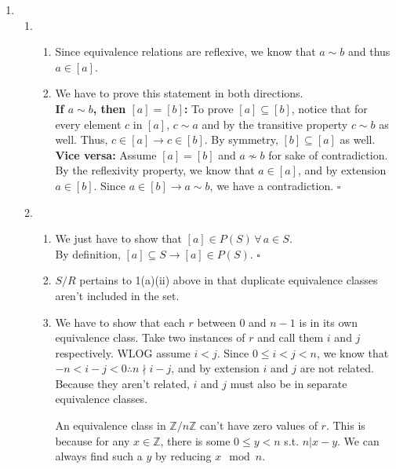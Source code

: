 \documentclass[12pt]{article}
\begin{document}
    \begin{enumerate}
        \item \begin{enumerate}
                  \item \begin{enumerate}
                            \item Since equivalence relations are reflexive, we know that $a \sim b$ and thus $a \in [a]$.
                            \item We have to prove this statement in both directions. \\
                            \textbf{If $a \sim b$, then $[a]=[b]$:}
                            To prove $[a] \subseteq [b]$, notice that for every element $c$ in $[a]$, $c \sim a$ and by the transitive property $c \sim b$ as well. Thus, $c \in [a] \rightarrow c \in [b]$.
                            By symmetry, $[b] \subseteq [a]$ as well. \\
                            \textbf{Vice versa:} Assume $[a] = [b]$ and $a \nsim b$ for sake of contradiction.
                            By the reflexivity property, we know that $a \in [a]$, and by extension $a \in [b]$.
                            Since $a \in [b] \rightarrow a \sim b$, we have a contradiction. $\square$
                  \end{enumerate}
                  \item \begin{enumerate}
                            \item We just have to show that $[a] \in P(S)\,\forall\,a \in S$. \\
                            By definition, $[a] \subseteq S \rightarrow [a] \in P(S)$. $\square$
                            \item $S/R$ pertains to 1(a)(ii) above in that duplicate equivalence classes aren't included in the set.
                            \item We have to show that each $r$ between $0$ and $n-1$ is in its own equivalence class.
                            Take two instances of $r$ and call them $i$ and $j$ respectively.
                            WLOG assume $i<j$.
                            Since $0 \le i < j < n$, we know that $-n < i-j < 0 \therefore n \nmid i-j$, and by extension $i$ and $j$ are not related.
                            Because they aren't related, $i$ and $j$ must also be in separate equivalence classes.

                            An equivalence class in $\mathbb{Z}/n\mathbb{Z}$ can't have zero values of $r$.
                            This is because for any $x \in \mathbb{Z}$, there is some $0 \le y < n$ s.t. $n | x-y$.
                            We can always find such a $y$ by reducing $x \mod n$.


\end{enumerate}
\end{enumerate}
\end{enumerate}
\end{document}
